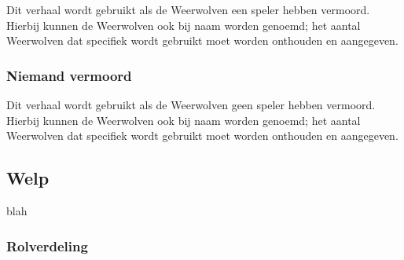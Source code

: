 \documentclass[12pt]{article}
\begin{document}
    Dit verhaal wordt gebruikt als de Weerwolven een speler hebben vermoord. Hierbij kunnen de Weerwolven ook bij naam worden genoemd; het aantal Weerwolven dat specifiek wordt gebruikt moet worden onthouden en aangegeven.
    
    \begin{center}
    \end{center}
    
    \subsubsection{Niemand vermoord}
    
    Dit verhaal wordt gebruikt als de Weerwolven geen speler hebben vermoord. Hierbij kunnen de Weerwolven ook bij naam worden genoemd; het aantal Weerwolven dat specifiek wordt gebruikt moet worden onthouden en aangegeven.
    
    \begin{center}
    \end{center}
  
  \subsection{Welp}
    
      blah
  
    \subsubsection{Rolverdeling}
    
\end{document}
